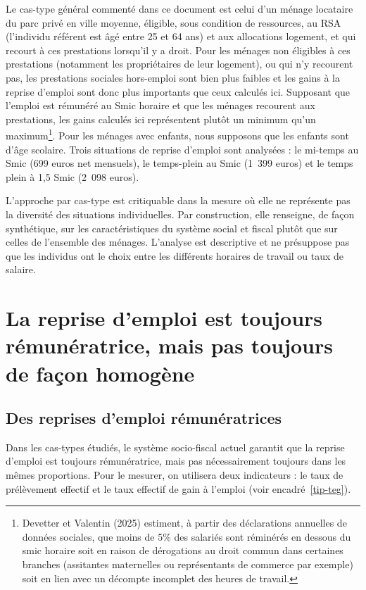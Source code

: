 \documentclass[
  french,
]{article}
\begin{document}
Le cas-type général commenté dans ce document est celui d'un ménage
locataire du parc privé en ville moyenne, éligible, sous condition de
ressources, au RSA (l'individu référent est âgé entre 25 et 64 ans) et
aux allocations logement, et qui recourt à ces prestations lorsqu'il y a
droit. Pour les ménages non éligibles à ces prestations (notamment les
propriétaires de leur logement), ou qui n'y recourent pas, les
prestations sociales hors-emploi sont bien plus faibles et les gains à
la reprise d'emploi sont donc plus importants que ceux calculés ici.
Supposant que l'emploi est rémunéré au Smic horaire et que les ménages
recourent aux prestations, les gains calculés ici représentent plutôt un
minimum qu'un maximum\footnote{Devetter et Valentin (2025) estiment, à
  partir des déclarations annuelles de données sociales, que moins de
  5\% des salariés sont réminérés en dessous du smic horaire soit en
  raison de dérogations au droit commun dans certaines branches
  (assitantes maternelles ou représentants de commerce par exemple) soit
  en lien avec un décompte incomplet des heures de travail.}. Pour les
ménages avec enfants, nous supposons que les enfants sont d'âge
scolaire. Trois situations de reprise d'emploi sont analysées : le
mi-temps au Smic (699 euros net mensuels), le temps-plein au Smic (1~399
euros) et le temps plein à 1,5 Smic (2~098 euros).

L'approche par cas-type est critiquable dans la mesure où elle ne
représente pas la diversité des situations individuelles. Par
construction, elle renseigne, de façon synthétique, sur les
caractéristiques du système social et fiscal plutôt que sur celles de
l'ensemble des ménages. L'analyse est descriptive et ne présuppose pas
que les individus ont le choix entre les différents horaires de travail
ou taux de salaire.

\section{La reprise d'emploi est toujours rémunératrice, mais pas
toujours de façon
homogène}\label{la-reprise-demploi-est-toujours-ruxe9munuxe9ratrice-mais-pas-toujours-de-fauxe7on-homoguxe8ne}

\subsection{Des reprises d'emploi
rémunératrices}\label{des-reprises-demploi-ruxe9munuxe9ratrices}

Dans les cas-types étudiés, le système socio-fiscal actuel garantit que
la reprise d'emploi est toujours rémunératrice, mais pas nécessairement
toujours dans les mêmes proportions. Pour le mesurer, on utilisera deux
indicateurs : le taux de prélèvement effectif et le taux effectif de
gain à l'emploi (voir encadré~\ref{tip-teg}).
\end{document}
